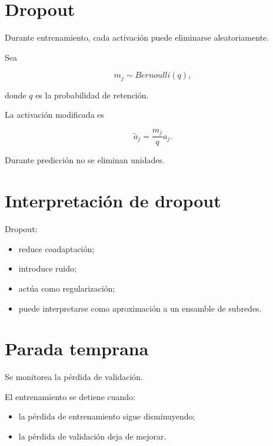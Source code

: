 \documentclass[
  spanish,
  10.5pt,
  letterpaper,
  DIV=11,
  numbers=noendperiod,
  oneside,
  open=any]{scrreprt}
\providecommand{\tightlist}{%
  \setlength{\itemsep}{0pt}\setlength{\parskip}{0pt}}
\theoremstyle{definition}
\theoremstyle{definition}
\theoremstyle{plain}
\theoremstyle{remark}
\begin{document}
\section*{Dropout}\label{dropout-1}


Durante entrenamiento, cada activación puede eliminarse aleatoriamente.

Sea

\[
m_j
\sim
Bernoulli(q),
\]

donde \(q\) es la probabilidad de retención.

La activación modificada es

\[
\widetilde{a}_j
=
\frac{m_j}{q}a_j.
\]

Durante predicción no se eliminan unidades.

\section*{Interpretación de dropout}\label{interpretaciuxf3n-de-dropout}


Dropout:

\begin{itemize}
\tightlist
\item
  reduce coadaptación;
\item
  introduce ruido;
\item
  actúa como regularización;
\item
  puede interpretarse como aproximación a un ensamble de subredes.
\end{itemize}

\section*{Parada temprana}\label{parada-temprana}


Se monitorea la pérdida de validación.

El entrenamiento se detiene cuando:

\begin{itemize}
\tightlist
\item
  la pérdida de entrenamiento sigue disminuyendo;
\item
  la pérdida de validación deja de mejorar.
\end{itemize}
\end{document}
